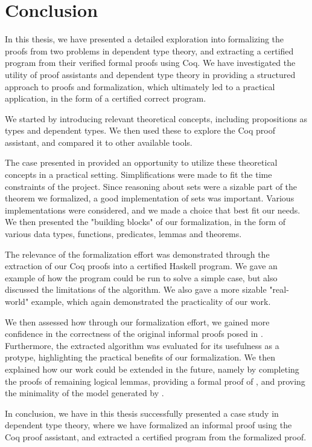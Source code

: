 \chapter{Conclusion}

In this thesis, we have presented a detailed exploration into formalizing
the proofs from two problems in dependent type theory,
and extracting a certified program from their verified formal proofs using Coq.
We have investigated the utility of proof assistants and dependent type theory
in providing a structured approach to proofs and formalization,
which ultimately led to a practical application,
in the form of a certified correct program.

We started by introducing relevant theoretical concepts,
including propositions as types and dependent types.
We then used these to explore the Coq proof assistant,
and compared it to other available tools.

The case presented in 
provided an opportunity to utilize these theoretical concepts in a practical setting.
Simplifications were made to fit the time constraints of the project.
Since reasoning about sets were a sizable part of the theorem we formalized,
a good implementation of sets was important.
Various implementations were considered, and we made a choice that best fit our needs.
We then presented the "building blocks" of our formalization,
in the form of various data types, functions, predicates, lemmas and theorems.

The relevance of the formalization effort was demonstrated through the extraction
of our Coq proofs into a certified Haskell program.
We gave an example of how the program could be run to solve a simple case,
but also discussed the limitations of the algorithm.
We also gave a more sizable "real-world" example, which again
demonstrated the practicality of our work.

We then assessed how through our formalization effort,
we gained more confidence in the correctness of the original informal proofs posed in \cite{mbezem}.
Furthermore, the extracted algorithm was evaluated for its usefulness as a protype,
highlighting the practical benefits of our formalization.
We then explained how our work could be extended in the future,
namely by completing the proofs of remaining logical lemmas,
providing a formal proof of , and proving the minimality of the model generated by .

In conclusion, we have in this thesis successfully presented
a case study in dependent type theory, where we have formalized an informal proof using
the Coq proof assistant, and extracted a certified program from the formalized proof.
